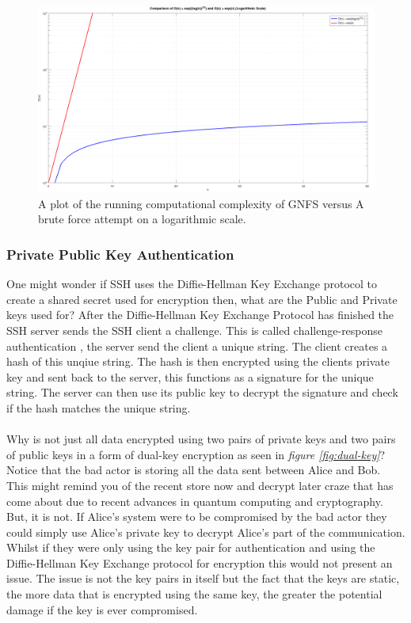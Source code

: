 \documentclass[12pt]{article}
\begin{document}
\begin{figure}
  \centering
  \includegraphics[width=\textwidth]{graph.png}
  \caption{A plot of the running computational complexity of GNFS versus A brute force attempt on a logarithmic scale.}
  \label{fig:running-complexity}
\end{figure}

\subsubsection{Private Public Key Authentication}
One might wonder if SSH uses the Diffie-Hellman Key Exchange protocol to create a shared secret 
used for encryption then, what are the Public and Private keys used for?
After the Diffie-Hellman Key Exchange Protocol has finished the SSH server sends the SSH client a challenge.
This is called challenge-response authentication \cite{ChallengeResponseAuthentication2024}, the 
server send the client a unique string. The client creates a hash of this unqiue string. The hash 
is then encrypted using the clients private key and sent back to the server, this functions as 
a signature for the unique string. The server can then use its public key to decrypt the signature and check if 
the hash matches the unique string.
\\
\\
Why is not just all data encrypted using two pairs of private keys and two pairs of public keys in a form 
of dual-key encryption as seen in \textit{figure \ref{fig:dual-key}}?
Notice that the bad actor is storing all the data sent between Alice and Bob.
This might remind you of the recent store now and decrypt later craze that has come about due 
to recent advances in quantum computing and cryptography. But, it is not. 
If Alice's system were to be compromised by the bad actor they could simply use 
Alice's private key to decrypt Alice's part of the communication.
Whilst if they were only using the key pair for authentication and using the 
Diffie-Hellman Key Exchange protocol for encryption this would not present an issue.
The issue is not the key pairs in itself but the fact that the keys are static, 
the more data that is encrypted using the same key, the greater the potential damage if 
the key is ever compromised.
\end{document}
